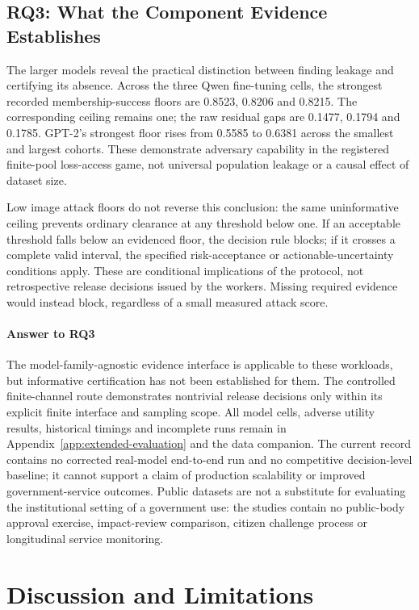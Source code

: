 \documentclass[conference,compsoc]{IEEEtran}
\begin{document}
\subsection{RQ3: What the Component Evidence Establishes}
The larger models reveal the practical distinction between finding leakage
and certifying its absence. Across the three Qwen fine-tuning cells, the
strongest recorded membership-success floors are 0.8523, 0.8206 and 0.8215.
The corresponding ceiling remains one; the raw residual gaps are
0.1477, 0.1794 and 0.1785. GPT-2's strongest floor rises from 0.5585 to
0.6381 across the smallest and largest cohorts. These demonstrate adversary
capability in the registered finite-pool loss-access game, not universal
population leakage or a causal effect of dataset size.

Low image attack floors do not reverse this conclusion: the same
uninformative ceiling prevents ordinary clearance at any threshold below
one. If an acceptable threshold falls below an evidenced floor, the
decision rule blocks; if it crosses a complete valid interval, the specified
risk-acceptance or actionable-uncertainty conditions apply. These are
conditional implications of the protocol, not retrospective release
decisions issued by the workers. Missing required evidence would instead
block, regardless of a small measured attack score.

\paragraph{Answer to RQ3}
The model-family-agnostic evidence interface is applicable to these
workloads, but informative certification has not been established for
them. The controlled finite-channel route demonstrates nontrivial release
decisions only within its explicit finite interface and sampling scope.
All model cells, adverse utility results, historical timings and incomplete
runs remain in Appendix~\ref{app:extended-evaluation} and the data companion.
The current record contains no corrected real-model end-to-end run and no
competitive decision-level baseline; it cannot support a claim of production
scalability or improved government-service outcomes. Public datasets are
not a substitute for evaluating the institutional setting of a government
use: the studies contain no public-body approval exercise, impact-review
comparison, citizen challenge process or longitudinal service monitoring.



\section{Discussion and Limitations}
\end{document}
